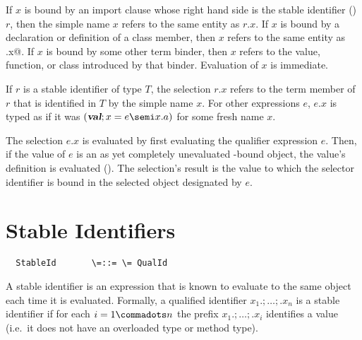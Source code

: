 \documentclass[11pt]{report}
\begin{document}
\begin{itemize}
If $x$ is bound by an import clause whose right hand side is the
stable identifier () $r$, then the simple name $x$
refers to the same entity as $r.x$. If $x$ is bound by a declaration
or definition of a class member, then $x$ refers to the same entity as
\verb@this.x@. If $x$ is bound by some other term binder, then $x$
refers to the value, function, or class introduced by that binder.
Evaluation of $x$ is immediate.


If $r$ is a stable identifier of type $T$, the
selection $r.x$ refers to the term member of $r$ that is identified in
$T$ by the simple name $x$.  For other expressions $e$, $e.x$ is typed
as if it was $(\VAL;x=e\semi x.a)$ for some fresh name $x$.

The selection $e.x$ is evaluated by first evaluating the qualifier
expression $e$. Then, if the value of $e$ is an as yet completely
unevaluated \verb@let@-bound object, the value's definition is
evaluated (). The selection's result is the value to
which the selector identifier is bound in the selected object
designated by $e$.

\section{Stable Identifiers}
\label{sec:stableids}

\syntax\begin{verbatim}
  StableId       \=::= \= QualId
\end{verbatim}

A stable identifier is an expression that is known to evaluate to the
same object each time it is evaluated. Formally, a qualified
identifier $x_1.;\ldots;.x_n$ is a stable identifier if for each $i =
1 \commadots n$ the prefix $x_1.; \ldots ;.x_i$ identifies a value
(i.e.\ it does not have an overloaded type or method type).


\end{itemize}
\end{document}
